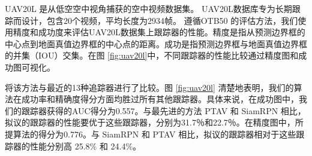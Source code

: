 UAV20L \cite{mueller2016benchmark} 是从低空空中视角捕获的空中视频数据集。 UAV20L数据库专为长期跟踪而设计，包含20个视频，平均长度为2934帧。
遵循OTB50 \cite{OTB}的评估方法，我们使用精度和成功度来评估UAV20L数据集上跟踪器的性能。精度是指从预测边界框的中心点到地面真值边界框的中心点的距离。成功是指预测边界框与地面真值边界框的并集​​（IOU）交集。在图 \ref{fig:uav20l}中，不同跟踪器的性能比较通过精度图和成功图可视化。

将该方法与最近的13种追踪器进行了比较。图 \ref{fig:uav20l} 清楚地表明，我们的算法在成功率和精确度得分方面均胜过所有其他跟踪器。具体来说，在成功图中，我们的跟踪器获得的AUC得分为0.557。与最先进的方法 PTAV \cite{fan2018parallel} 和 SiamRPN \cite{SiamRPN}相比，拟议的跟踪器的性能要优于这些跟踪器，分别为31.7％和22.7％。在精度图中，所提算法的得分为0.776。与 SiamRPN \cite{SiamRPN} 和 PTAV \cite{fan2018parallel}相比，拟议的跟踪器相对于这些跟踪器的性能分别高 25.8\% 和 24.4\%。

